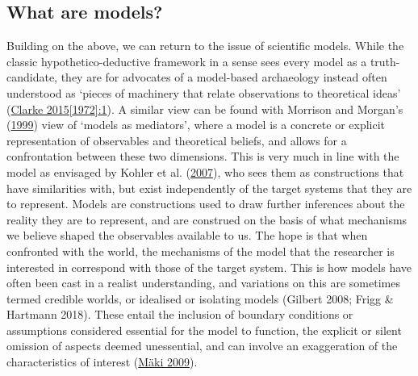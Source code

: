 \documentclass[
  a4paper,
  oneside]{uiophdthesis}
\begin{document}
\hypertarget{what-are-models}{%
\subsection{What are models?}\label{what-are-models}}

Building on the above, we can return to the issue of scientific models. While the classic hypothetico-deductive framework in a sense sees every model as a truth-candidate, they are for advocates of a model-based archaeology instead often understood as `pieces of machinery that relate observations to theoretical ideas' (\protect\hyperlink{ref-clarke1972}{Clarke 2015{[}1972{]}:1}). A similar view can be found with Morrison and Morgan's (\protect\hyperlink{ref-morrison1999}{1999}) view of `models as mediators', where a model is a concrete or explicit representation of observables and theoretical beliefs, and allows for a confrontation between these two dimensions. This is very much in line with the model as envisaged by Kohler et al. (\protect\hyperlink{ref-kohler2007}{2007}), who sees them as constructions that have similarities with, but exist independently of the target systems that they are to represent. Models are constructions used to draw further inferences about the reality they are to represent, and are construed on the basis of what mechanisms we believe shaped the observables available to us. The hope is that when confronted with the world, the mechanisms of the model that the researcher is interested in correspond with those of the target system. This is how models have often been cast in a realist understanding, and variations on this are sometimes termed credible worlds, or idealised or isolating models (Gilbert 2008; Frigg \& Hartmann 2018). These entail the inclusion of boundary conditions or assumptions considered essential for the model to function, the explicit or silent omission of aspects deemed unessential, and can involve an exaggeration of the characteristics of interest (\protect\hyperlink{ref-muxe4ki2009}{Mäki 2009}).
\end{document}

